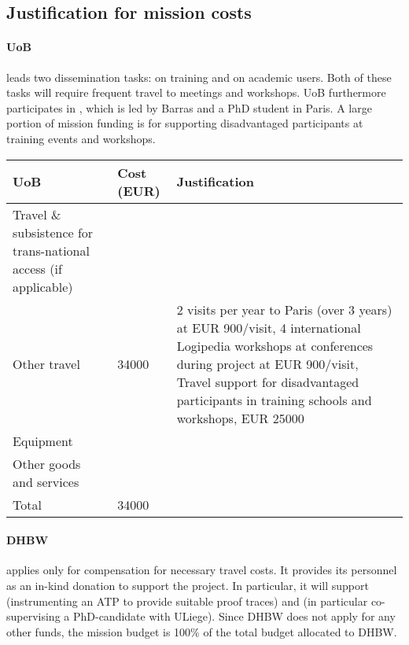 \subsection*{Justification for mission costs}

\paragraph*{UoB}
leads two dissemination tasks: 
 on training and 
 on academic users.
Both of these tasks will require frequent travel to meetings and workshops.
UoB furthermore participates in , which is led by Barras and a PhD student in Paris. A large portion of mission funding is for supporting disadvantaged participants at training events and workshops.

\begin{center}
\begin{tabular}{|p{9em}|l|p{}|}
\hline
  UoB & Cost (EUR)  & Justification \\
  \hline
  Travel \& subsistence for trans-national access (if applicable) & & \\
  \hline
  Other travel & 34000 & 2 visits per year to Paris (over 3 years) at EUR 900/visit,
                         4 international Logipedia workshops at conferences during project at EUR 900/visit,
                         Travel support for disadvantaged participants in training schools and workshops, EUR 25000
  \\                         
  \hline
  Equipment & & \\
  \hline
  Other goods and services & & \\
  \hline
  \hline
  Total & 34000 & \\
  \hline
\end{tabular}
\end{center}

\paragraph*{DHBW}
applies only for compensation for necessary travel costs. It
provides its personnel as an in-kind donation to support the
project. In particular, it will support  (instrumenting
an ATP to provide suitable proof traces) and  (in
particular co-supervising a PhD-candidate with ULiege). Since DHBW does
not apply for any other funds, the mission budget is 100\% of the
total budget allocated to DHBW.

